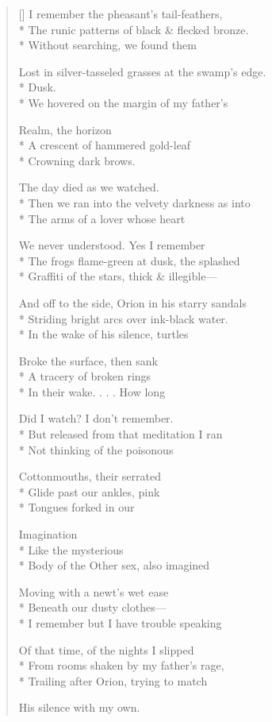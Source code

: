 \label{ch:lears_daughter}
\settowidth{\versewidth}{Lost in silver-tasseled grasses at the swamp's edge.}
\begin{verse}[\versewidth]
I remember the pheasant's tail-feathers,\\*
The runic patterns of black \& flecked bronze.\\*
Without searching, we found them

Lost in silver-tasseled grasses at the swamp's edge.\\*
Dusk.\\*
We hovered on the margin of my father's

Realm, the horizon\\*
A crescent of hammered gold-leaf\\*
Crowning dark brows.

The day died as we watched.\\*
Then we ran into the velvety darkness as into\\*
The arms of a lover whose heart

We never understood.  Yes I remember\\*
The frogs flame-green at dusk, the splashed\\*
Graffiti of the stars, thick \& illegible---

And off to the side, Orion in his starry sandals\\*
Striding bright arcs over ink-black water.\\*
In the wake of his silence, turtles

Broke the surface, then sank\\*
A tracery of broken rings\\*
In their wake. . . . How long

Did I watch? I don't remember.\\*
But released from that meditation I ran\\*
Not thinking of the poisonous

Cottonmouths, their serrated \\*
Glide past our ankles, pink\\*
Tongues forked in our

Imagination\\*
Like the mysterious\\*
Body of the Other sex, also imagined

Moving with a newt's wet ease\\*
Beneath our dusty clothes---\\*
I remember but I have trouble speaking

Of that time, of the nights I slipped\\*
From rooms shaken by my father's rage,\\*
Trailing after Orion, trying to match

His silence with my own.
\end{verse}
